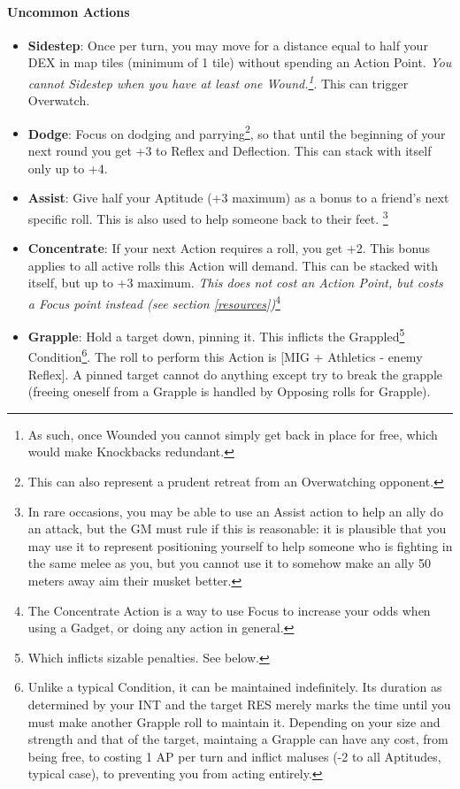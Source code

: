 \paragraph{Uncommon Actions}
\begin{itemize}
    \item \textbf{Sidestep}: Once per turn, you may move for a distance equal to half your DEX in map tiles (minimum of 1 tile) without spending an Action Point. \textit{You cannot Sidestep when you have at least one Wound.\footnote{As such, once Wounded you cannot simply get back in place for free, which would make Knockbacks redundant.}}. This can trigger Overwatch.
    \item \textbf{Dodge}: Focus on dodging and parrying\footnote{This can also represent a prudent retreat from an Overwatching opponent.}, so that until the beginning of your next round you get +3 to Reflex and Deflection. This can stack with itself only up to +4.
    \item \textbf{Assist}: Give half your Aptitude (+3 maximum) as a bonus to a friend's next specific roll. This is also used to help someone back to their feet. \footnote{In rare occasions, you may be able to use an Assist action to help an ally do an attack, but the GM must rule if this is reasonable: it is plausible that you may use it to represent positioning yourself to help someone who is fighting in the same melee as you, but you cannot use it to somehow make an ally 50 meters away aim their musket better.}
    \item \textbf{Concentrate}: If your next Action requires a roll, you get +2. This bonus applies to all active rolls this Action will demand. This can be stacked with itself, but up to +3 maximum. \textit{This does not cost an Action Point, but costs a Focus point instead (see section \ref{resources})}\footnote{The Concentrate Action is a way to use Focus to increase your odds when using a Gadget, or doing any action in general.}
    \item \textbf{Grapple}: Hold a target down, pinning it. This inflicts the Grappled\footnote{Which inflicts sizable penalties. See below.} Condition\footnote{Unlike a typical Condition, it can be maintained indefinitely. Its duration as determined by your INT and the target RES merely marks the time until you must make another Grapple roll to maintain it. Depending on your size and strength and that of the target, maintaing a Grapple can have any cost, from being free, to costing 1 AP per turn and inflict maluses (-2 to all Aptitudes, typical case), to preventing you from acting entirely.}. The roll to perform this Action is [MIG + Athletics - enemy Reflex]. A pinned target cannot do anything except try to break the grapple (freeing oneself from a Grapple is handled by Opposing rolls for Grapple). \\

\end{itemize}
